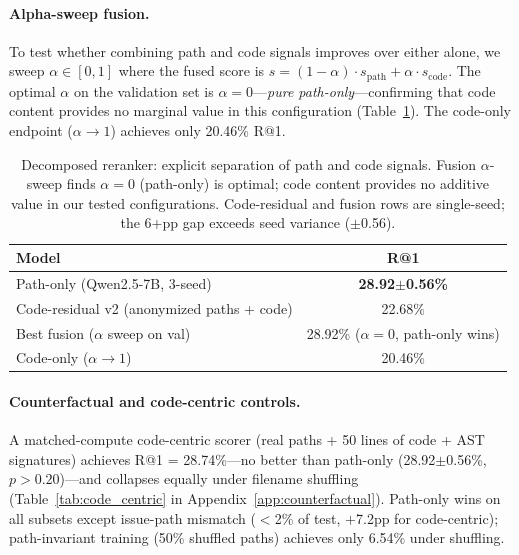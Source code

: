 \documentclass{article}
\begin{document}
\paragraph{Alpha-sweep fusion.}
To test whether combining path and code signals improves over either alone, we sweep $\alpha \in [0, 1]$ where the fused score is $s = (1-\alpha) \cdot s_{\text{path}} + \alpha \cdot s_{\text{code}}$.
The optimal $\alpha$ on the validation set is \textbf{$\alpha = 0$}---\emph{pure path-only}---confirming that code content provides no marginal value in this configuration (Table~\ref{tab:decomposed_reranker}).
The code-only endpoint ($\alpha \to 1$) achieves only 20.46\% R@1.

\begin{table}[t]
\centering
\caption{Decomposed reranker: explicit separation of path and code signals. Fusion $\alpha$-sweep finds $\alpha{=}0$ (path-only) is optimal; code content provides no additive value in our tested configurations. Code-residual and fusion rows are single-seed; the 6+pp gap exceeds seed variance ($\pm$0.56).}
\label{tab:decomposed_reranker}
\small
\begin{tabular}{lc}
\toprule
\textbf{Model} & \textbf{R@1} \\
\midrule
Path-only (Qwen2.5-7B, 3-seed) & \textbf{28.92$\pm$0.56\%} \\
Code-residual v2 (anonymized paths + code) & 22.68\% \\
Best fusion ($\alpha$ sweep on val) & 28.92\% ($\alpha{=}0$, path-only wins) \\
Code-only ($\alpha \to 1$) & 20.46\% \\
\bottomrule
\end{tabular}
\end{table}

\paragraph{Counterfactual and code-centric controls.}
A matched-compute code-centric scorer (real paths + 50 lines of code + AST signatures) achieves R@1 = 28.74\%---no better than path-only (28.92$\pm$0.56\%, $p > 0.20$)---and collapses equally under filename shuffling (Table~\ref{tab:code_centric} in Appendix~\ref{app:counterfactual}).
Path-only wins on all subsets except issue-path mismatch ($<$2\% of test, $+$7.2pp for code-centric); path-invariant training (50\% shuffled paths) achieves only 6.54\% under shuffling.
\end{document}
